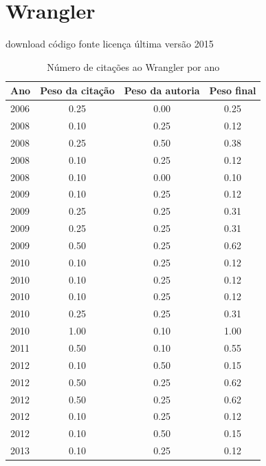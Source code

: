\section{Wrangler}
\checkmark download
\checkmark código fonte
\checkmark licença
\checkmark última versão 2015
\begin{table}[H]
\caption{Número de citações ao Wrangler por ano}
\centering
\begin{tabular}{| l | c | c | c |}
  \hline
  Ano & Peso da citação & Peso da autoria & Peso final \\
  \hline
  2006
    & 0.25
    & 0.00
    & {\color{red} 0.25} \\
\hline
  2008
    & 0.10
    & 0.25
    & {\color{red} 0.12} \\
  2008
    & 0.25
    & 0.50
    & {\color{red} 0.38} \\
  2008
    & 0.10
    & 0.25
    & {\color{red} 0.12} \\
  2008
    & 0.10
    & 0.00
    & {\color{red} 0.10} \\
\hline
  2009
    & 0.10
    & 0.25
    & {\color{red} 0.12} \\
  2009
    & 0.25
    & 0.25
    & {\color{red} 0.31} \\
  2009
    & 0.25
    & 0.25
    & {\color{red} 0.31} \\
  2009
    & 0.50
    & 0.25
    & {\color{blue} 0.62} \\
\hline
  2010
    & 0.10
    & 0.25
    & {\color{red} 0.12} \\
  2010
    & 0.10
    & 0.25
    & {\color{red} 0.12} \\
  2010
    & 0.10
    & 0.25
    & {\color{red} 0.12} \\
  2010
    & 0.25
    & 0.25
    & {\color{red} 0.31} \\
  2010
    & 1.00
    & 0.10
    & {\color{blue} 1.00} \\
\hline
  2011
    & 0.50
    & 0.10
    & {\color{blue} 0.55} \\
\hline
  2012
    & 0.10
    & 0.50
    & {\color{red} 0.15} \\
  2012
    & 0.50
    & 0.25
    & {\color{blue} 0.62} \\
  2012
    & 0.50
    & 0.25
    & {\color{blue} 0.62} \\
  2012
    & 0.10
    & 0.25
    & {\color{red} 0.12} \\
  2012
    & 0.10
    & 0.50
    & {\color{red} 0.15} \\
\hline
  2013
    & 0.10
    & 0.25
    & {\color{red} 0.12} \\

\end{tabular}
\end{table}
